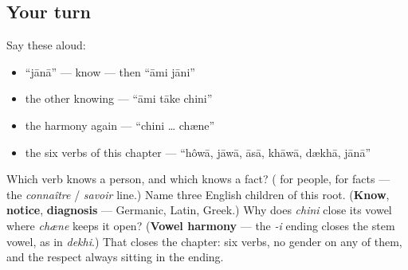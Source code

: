 \subsection*{Your turn}
Say these aloud:

\begin{itemize}
\raggedright
  \item \textquotedblleft{}jānā\textquotedblright{} — know — then \textquotedblleft{}āmi jāni\textquotedblright{}
  \item the other knowing — \textquotedblleft{}āmi tāke chini\textquotedblright{}
  \item the harmony again — \textquotedblleft{}chini … chæne\textquotedblright{}
  \item the six verbs of this chapter — \textquotedblleft{}hôwā, jāwā, āsā, khāwā, dækhā, jānā\textquotedblright{}
\end{itemize}

\begin{tcolorbox}[breakable,colback=teal!4,colframe=teal!35!black,title={Before you move on}]
Which verb knows a person, and which knows a fact? (\textbf{} for people, \textbf{} for facts — the \emph{connaître} / \emph{savoir} line.) Name three English children of this root. (\textbf{Know}, \textbf{notice}, \textbf{diagnosis} — Germanic, Latin, Greek.) Why does \emph{chini} close its vowel where \emph{chæne} keeps it open? (\textbf{Vowel harmony} — the \emph{-i} ending closes the stem vowel, as in \emph{dekhi}.) That closes the chapter: six verbs, no gender on any of them, and the respect always sitting in the ending.
\end{tcolorbox}
